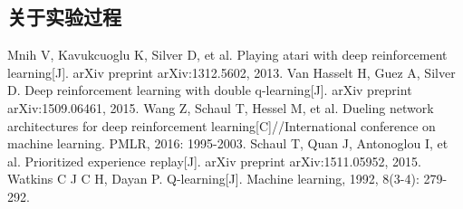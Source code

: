 \documentclass[a4paper,12pt]{article}
\begin{document}
\begin{CJK}{UTF8}{gbsn}
\subsection{关于实验过程}
\newpage
\renewcommand\refname{参考文献}
\begin{thebibliography}{99}
	Mnih V, Kavukcuoglu K, Silver D, et al. Playing atari with deep reinforcement learning[J]. arXiv preprint arXiv:1312.5602, 2013.
	Van Hasselt H, Guez A, Silver D. Deep reinforcement learning with double q-learning[J]. arXiv preprint arXiv:1509.06461, 2015.
	Wang Z, Schaul T, Hessel M, et al. Dueling network architectures for deep reinforcement learning[C]//International conference on machine learning. PMLR, 2016: 1995-2003.
	Schaul T, Quan J, Antonoglou I, et al. Prioritized experience replay[J]. arXiv preprint arXiv:1511.05952, 2015.
	Watkins C J C H, Dayan P. Q-learning[J]. Machine learning, 1992, 8(3-4): 279-292.
\end{thebibliography}
\end{CJK}
\end{document}
